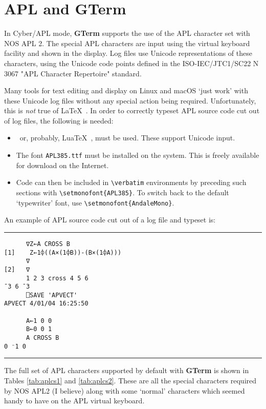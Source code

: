 \documentclass[a4paper,twoside,11pt]{article}
\newcommand{\newpara}{\par\vspace{4mm}\noindent}
\begin{document}
\section{APL and \textbf{GTerm}}\label{aplinfo}
In Cyber/APL mode, \textbf{GTerm} supports the use of the APL character set with NOS APL 2. The special
APL characters are input using the virtual keyboard facility and shown in the display. Log files
use Unicode representations of these characters, using the Unicode code points defined in the
ISO-IEC/JTC1/SC22 N 3067 "APL Character Repertoire" standard.
\newpara
Many tools for text editing and display on Linux and macOS `just work' with these Unicode log
files without any special action being required. Unfortunately, this is \textit{not} true of \LaTeX\ .
In order to correctly typeset APL source code cut out of log files, the following is needed:
\begin{itemize}
\item \XeTeX\ or, probably, Lua\TeX\ , must be used. These support Unicode input. 
\item The font \texttt{APL385.ttf} must be installed on the system. This is freely
      available for download on the Internet.
\item Code can then be included in \texttt{\textbackslash{}verbatim} 
      environments by preceding such sections with
      \texttt{\textbackslash{}setmonofont\{APL385\}}. 
      To switch back to the default `typewriter' font, use
      \texttt{\textbackslash{}setmonofont\{AndaleMono\}}. 
\end{itemize}
An example of APL source code cut out of a log file and typeset is:
\newpara
\hrule
\setmonofont{APL385}
\begin{verbatim}
      ∇Z←A CROSS B
[1]    Z←1⌽((A×(1⌽B))-(B×(1⌽A)))
      ∇
[2]   ∇
      1 2 3 cross 4 5 6
¯3 6 ¯3
      ⎕SAVE 'APVECT'
APVECT 4/01/04 16:25:50

      A←1 0 0
      B←0 0 1
      A CROSS B
0 ⁻1 0
\end{verbatim}
\hrule
\newpara
The full set of APL characters supported by default with \textbf{GTerm} is shown in 
Tables \ref{tab:aplcs1} and \ref{tab:aplcs2}.
These are all the special characters required by NOS APL2 (I believe) along with some `normal' characters which seemed
handy to have on the APL virtual keyboard.
\end{document}
